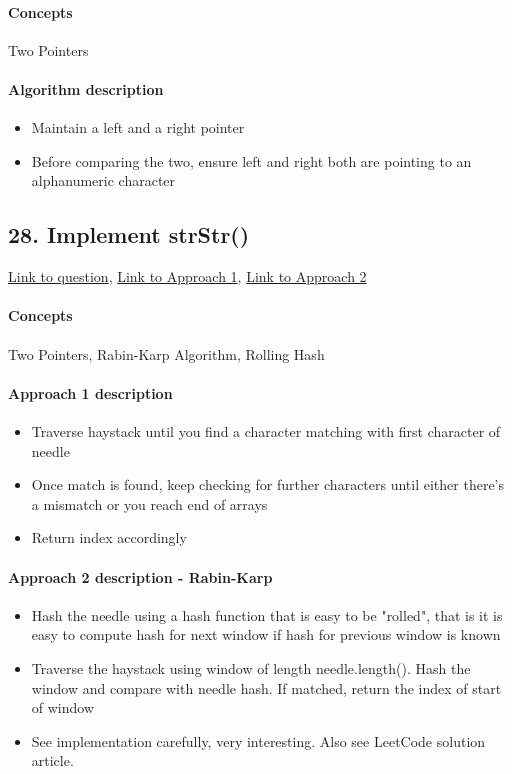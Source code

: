 \documentclass[11pt]{book}
\begin{document}
\paragraph{Concepts}
Two Pointers
\paragraph{Algorithm description}
\begin{itemize}
    \item Maintain a left and a right pointer
    \item Before comparing the two, ensure left and right both are pointing to an
    alphanumeric character
\end{itemize}

\subsection{28. Implement strStr()}
\href{https://leetcode.com/problems/implement-strstr/}{Link to question},
\href{https://leetcode.com/submissions/detail/333634575/}{Link to Approach 1},
\href{https://leetcode.com/submissions/detail/333729270/}{Link to Approach 2}
\paragraph{Concepts}
Two Pointers, Rabin-Karp Algorithm, Rolling Hash
\paragraph{Approach 1 description}
\begin{itemize}
    \item Traverse haystack until you find a character matching with first character of
    needle
    \item Once match is found, keep checking for further characters 
    until either there's a mismatch or you reach end of arrays
    \item Return index accordingly
\end{itemize}
\paragraph{Approach 2 description - Rabin-Karp}
\begin{itemize}
    \item Hash the needle using a hash function that is easy to be "rolled", that is it is
    easy to compute hash for next window if hash for previous window is known
    \item Traverse the haystack using window of length needle.length(). Hash the window and 
    compare with needle hash. If matched, return the index of start of window
    \item See implementation carefully, very interesting. Also see LeetCode solution article.
\end{itemize}
\end{document}
